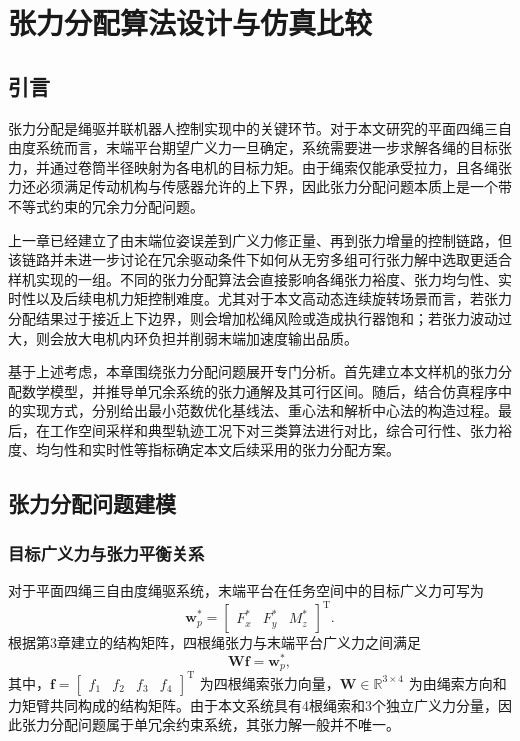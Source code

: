 
\chapter{张力分配算法设计与仿真比较}

\section{引言}

张力分配是绳驱并联机器人控制实现中的关键环节。对于本文研究的平面四绳三自由度系统而言，末端平台期望广义力一旦确定，系统需要进一步求解各绳的目标张力，并通过卷筒半径映射为各电机的目标力矩。由于绳索仅能承受拉力，且各绳张力还必须满足传动机构与传感器允许的上下界，因此张力分配问题本质上是一个带不等式约束的冗余力分配问题\cite{gouttefarde2007wrench,phan2021wrenchclosure,tao2021tensiondistribution}。

上一章已经建立了由末端位姿误差到广义力修正量、再到张力增量的控制链路，但该链路并未进一步讨论在冗余驱动条件下如何从无穷多组可行张力解中选取更适合样机实现的一组。不同的张力分配算法会直接影响各绳张力裕度、张力均匀性、实时性以及后续电机力矩控制难度。尤其对于本文高动态连续旋转场景而言，若张力分配结果过于接近上下边界，则会增加松绳风险或造成执行器饱和；若张力波动过大，则会放大电机内环负担并削弱末端加速度输出品质\cite{cao2023realtimetension,song2024realtimemethod,wang2024dynamictension}。

基于上述考虑，本章围绕张力分配问题展开专门分析。首先建立本文样机的张力分配数学模型，并推导单冗余系统的张力通解及其可行区间。随后，结合仿真程序中的实现方式，分别给出最小范数优化基线法、重心法和解析中心法的构造过程。最后，在工作空间采样和典型轨迹工况下对三类算法进行对比，综合可行性、张力裕度、均匀性和实时性等指标确定本文后续采用的张力分配方案。

\section{张力分配问题建模}

\subsection{目标广义力与张力平衡关系}

对于平面四绳三自由度绳驱系统，末端平台在任务空间中的目标广义力可写为
\begin{equation}
  \bm w_p^\ast=\begin{bmatrix} F_x^\ast & F_y^\ast & M_z^\ast \end{bmatrix}^{\mathrm T}.\label{eq:ch5-target-wrench}
\end{equation}
根据第3章建立的结构矩阵，四根绳张力与末端平台广义力之间满足
\begin{equation}
  \bm W\bm f=\bm w_p^\ast, \label{eq:ch5-wrench-balance}
\end{equation}
其中，$\bm f=\begin{bmatrix} f_1 & f_2 & f_3 & f_4 \end{bmatrix}^{\mathrm T}$ 为四根绳索张力向量，$\bm W\in\mathbb R^{3\times 4}$ 为由绳索方向和力矩臂共同构成的结构矩阵。由于本文系统具有4根绳索和3个独立广义力分量，因此张力分配问题属于单冗余约束系统，其张力解一般并不唯一\cite{gouttefarde2007wrench,tao2021tensiondistribution}。

